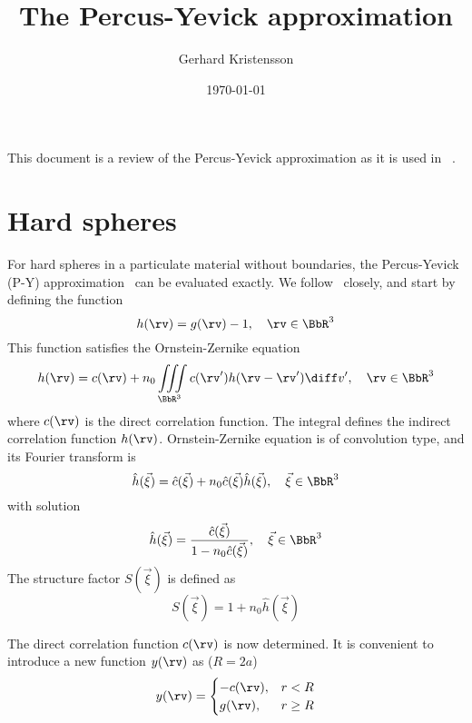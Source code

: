 \documentclass[12pt,a4paper]{article}
\newcommand{\numden}{n_{0}}
\begin{document}
\title{The Percus-Yevick approximation}
\author{Gerhard Kristensson}
\date{\today}
\maketitle

This document is a review of the Percus-Yevick approximation as it is used in ~\cite{TEAT-7272}.

\section{Hard spheres}
For hard spheres in a particulate material without boundaries, the Percus-Yevick (P-Y) approximation~\cite{Percus+Yevick1958} can be evaluated exactly.
We follow~\cite{Wertheim1963,Tsang+etal2001} closely, and start by defining the function
\begin{equation*}
  h(\rv)=g(\rv)-1,\quad \rv\in\BbR^3
\end{equation*}
This function satisfies the Ornstein-Zernike equation
\begin{equation*}
  h(\rv)=c(\rv)+\numden\iiint\limits_{\BbR^3}c(\rv')h(\rv-\rv')\diff v',\quad \rv\in\BbR^3
\end{equation*}
where $c(\rv)$ is the direct correlation function.
The integral defines the indirect correlation function $h(\rv)$.
Ornstein-Zernike equation is of convolution type, and its Fourier transform is
\begin{equation*}
  \hat{h}(\vec{\xi})=\hat{c}(\vec{\xi})+\numden\hat{c}(\vec{\xi})\hat{h}(\vec{\xi}),\quad \vec{\xi}\in\BbR^3
\end{equation*}
with solution
\begin{equation*}
  \hat{h}(\vec{\xi})=\frac{\hat{c}(\vec{\xi})}{1-\numden\hat{c}(\vec{\xi})},\quad \vec{\xi}\in\BbR^3
\end{equation*}
The structure factor $S(\vec{\xi})$ is defined as
\begin{equation*}
  S(\vec{\xi})=1+\numden\hat{h}(\vec{\xi})
\end{equation*}

The direct correlation function $c(\rv)$ is now determined.
It is convenient to introduce a new function $y(\rv)$ as ($R=2a$)
\begin{equation*}
  y(\rv)=\begin{cases}
           -c(\rv), & r<R \\
           g(\rv), & r\geq R
         \end{cases}
\end{equation*}
\end{document}
